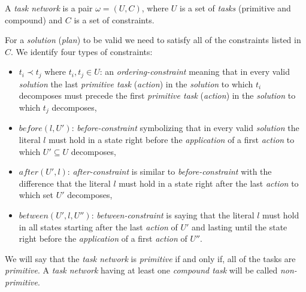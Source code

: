 \begin{defn}\label{def02:9}
    A \emph{task network} is a pair $\omega = (U,C)$, where $U$ is a set of \emph{tasks} (primitive and compound) and $C$ is a set of constraints.
    
    For a \emph{solution} (\emph{plan}) to be valid we need to satisfy all of the constraints listed in $C$. We identify four types of constraints:

    \begin{itemize}
        \item $t_i \prec t_j$ where $t_i,t_j \in U$: an \emph{ordering-constraint} meaning that in every valid \emph{solution} the last \emph{primitive task} (\emph{action}) in the \emph{solution} to which $t_i$ decomposes must precede the first \emph{primitive task} (\emph{action}) in the \emph{solution} to which $t_j$ decomposes,
        
        \item $before(l,U')$: \emph{before-constraint} symbolizing that in every valid \emph{solution} the literal $l$ must hold in a state right before the \emph{application} of a first \emph{action} to which $U' \subseteq U$ decomposes,
    
        \item $after(U',l)$: \emph{after-constraint} is similar to \emph{before-constraint} with the difference that the literal $l$ must hold in a state right after the last \emph{action} to which set $U'$ decomposes,
    
        \item $between(U',l,U'')$: \emph{between-constraint} is saying that the literal $l$ must hold in all states starting after the last \emph{action} of $U'$ and lasting until the state right before the \emph{application} of a first \emph{action} of $U''$.
    \end{itemize}

    We will say that the \emph{task network} is \emph{primitive} if and only if, all of the tasks are \emph{primitive}. A \emph{task network} having at least one \emph{compound task} will be called \emph{non-primitive}.
\end{defn}

